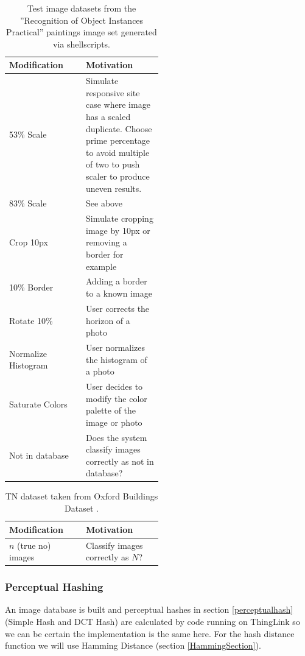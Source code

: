\documentclass[english,12pt,a4paper,pdftex,elec,utf8]{aaltothesis}
\begin{document}
\def\arraystretch{1.5}
\begin{table}[htb]
\caption{Test image datasets from the ''Recognition of Object Instances Practical'' \cite{Vedaldi2012} paintings image set generated via shellscripts. }
\label{modifiedimages}
\begin{center}
\begin{tabular}{lp{0.5\linewidth}}
  Modification & Motivation \\
  \hline \hline
  53\% Scale& Simulate responsive site case where image has a scaled duplicate. Choose prime percentage to avoid multiple of two to push scaler to produce uneven results.\\
  \hline
  83\% Scale& See above \\
  \hline
  Crop 10px & Simulate cropping image by 10px or removing a border for example\\
  \hline
  10\% Border & Adding a border to a known image \\
  \hline
  Rotate 10\% & User corrects the horizon of a photo \\
  \hline
  Normalize Histogram & User normalizes the histogram of a photo\\
  \hline
  Saturate Colors & User decides to modify the color palette of the image or photo\\
  \hline
  Not in database & Does the system classify images correctly as not in database?\\
\end{tabular}
\end{center}\end{table}

\def\arraystretch{1.5}
\begin{table}[htb]
\caption{TN dataset taken from Oxford Buildings Dataset \cite{PhilbinJamesArandjelovicReljaZisserman2012}.}
\label{truenegatives}
\begin{center}
\begin{tabular}{lp{0.5\linewidth}}
  Modification & Motivation \\
  \hline \hline
  $n$ (true no) images  & Classify images correctly as $N$?\\
\end{tabular}
\end{center}\end{table}

\subsubsection{Perceptual Hashing}
An image database is built and perceptual hashes in section \ref{perceptualhash} (Simple Hash and DCT Hash) are calculated by code running on ThingLink so we can be certain the implementation is the same here. For the hash distance function we will use Hamming Distance (section \ref{HammingSection}).
\end{document}
